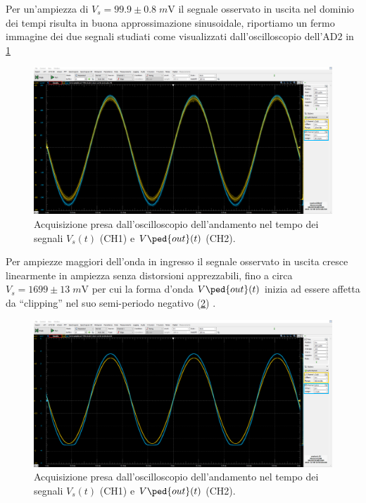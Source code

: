 \documentclass[10pt, a4paper, italian]{article}
\begin{document}
Per un'ampiezza di $V_s = 99.9 \pm 0.8 \; \si{m\V}$ il segnale osservato in
uscita nel dominio dei tempi risulta in buona approssimazione sinusoidale,
riportiamo un fermo immagine dei due segnali studiati come visualizzati
dall'oscilloscopio dell'AD2 in \cref{fig: aloop0.1}
\begin{figure}[htbp]
	\centering
	\includegraphics[scale=0.335]{Aloop100mV}
	\caption{Acquisizione presa dall'oscilloscopio dell'andamento nel tempo dei
	segnali $V_s (t)$ (CH1) e $V\ped{out} (t)$ (CH2). \label{fig: aloop0.1}}
\end{figure}

Per ampiezze maggiori dell'onda in ingresso il segnale osservato in uscita
cresce linearmente in ampiezza senza distorsioni apprezzabili, fino a circa
$V_s = 1699 \pm 13 \; \si{m\V}$ per cui la forma d'onda $V\ped{out} (t)$
inizia ad essere affetta da ``clipping'' nel suo semi-periodo negativo
(\cref{fig: aloop1.7}) .
\begin{figure}[htbp]
	\centering
	\includegraphics[scale=0.335]{Aloop1.7V}
	\caption{Acquisizione presa dall'oscilloscopio dell'andamento nel tempo dei
	segnali $V_s (t)$ (CH1) e $V\ped{out} (t)$ (CH2). \label{fig: aloop1.7}}
\end{figure}
\end{document}
